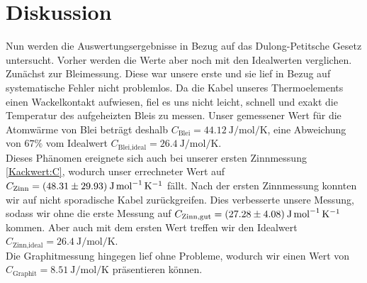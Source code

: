 \section{Diskussion}
\label{sec:Diskussion}
Nun werden die Auswertungsergebnisse in Bezug auf das Dulong-Petitsche Gesetz untersucht.
Vorher werden die Werte aber noch mit den Idealwerten verglichen.
Zunächst zur Bleimessung.
Diese war unsere erste und sie lief in Bezug auf systematische Fehler nicht problemlos.
Da die Kabel unseres Thermoelements einen Wackelkontakt aufwiesen, fiel es uns nicht leicht, schnell und exakt die Temperatur des aufgeheizten Bleis zu messen.
Unser gemessener Wert für die Atomwärme von Blei beträgt deshalb $C_{\text{Blei}}=\SI{44,12}{\joule\per\mol\per\kelvin}$, eine Abweichung von $67\%$ vom Idealwert $C_{\text{Blei,ideal}}=\SI{26,4}{\joule\per\mol\per\kelvin}$.\\
Dieses Phänomen ereignete sich auch bei unserer ersten Zinnmessung \ref{Kackwert:C}, wodurch unser errechneter Wert auf $C_{\text{Zinn}}=(\num{48,31 +- 29,93})\: \si{\joule\per\mol\per\kelvin}$ fällt.
Nach der ersten Zinnmessung konnten wir auf nicht sporadische Kabel zurückgreifen.
Dies verbesserte unsere Messung, sodass wir ohne die erste Messung auf $C_{\text{Zinn,gut}}=(\num{27,28 +- 4,08})\: \si{\joule\per\mol\per\kelvin}$ kommen.
Aber auch mit dem ersten Wert treffen wir den Idealwert $C_{\text{Zinn,ideal}}=\SI{26,4}{\joule\per\mol\per\kelvin}$.\\
Die Graphitmessung hingegen lief ohne Probleme, wodurch wir einen Wert von $C_{\text{Graphit}}=\SI{8,51}{\joule\per\mol\per\kelvin}$ präsentieren können.
